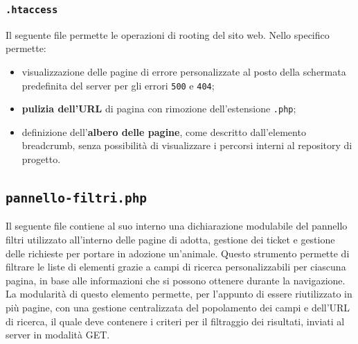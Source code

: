 \documentclass[a4paper,10pt]{article}
\begin{document}
	\subsubsection{\texttt{.htaccess}}
	Il seguente file permette le operazioni di rooting del sito web. Nello specifico permette:
	\begin{itemize}
		\item visualizzazione delle pagine di errore personalizzate al posto della schermata predefinita del server per gli errori \texttt{500} e \texttt{404};
		\item \textbf{pulizia dell'URL} di pagina con rimozione dell'estensione \texttt{.php};
		\item definizione dell'\textbf{albero delle pagine}, come descritto dall'elemento breadcrumb, senza possibilità di visualizzare i percorsi interni al repository di progetto.
	\end{itemize}
	\subsection{\texttt{pannello-filtri.php}}
	Il seguente file contiene al suo interno una dichiarazione modulabile del pannello filtri utilizzato all'interno delle pagine di adotta, gestione dei ticket e gestione delle richieste per portare in adozione un'animale. Questo strumento permette di filtrare le liste di elementi grazie a campi di ricerca personalizzabili per ciascuna pagina, in base alle informazioni che si possono ottenere durante la navigazione. La modularità di questo elemento permette, per l'appunto di essere riutilizzato in più pagine, con una gestione centralizzata del popolamento dei campi e dell'URL di ricerca, il quale deve contenere i criteri per il filtraggio dei risultati, inviati al server in modalità GET.
\end{document}
